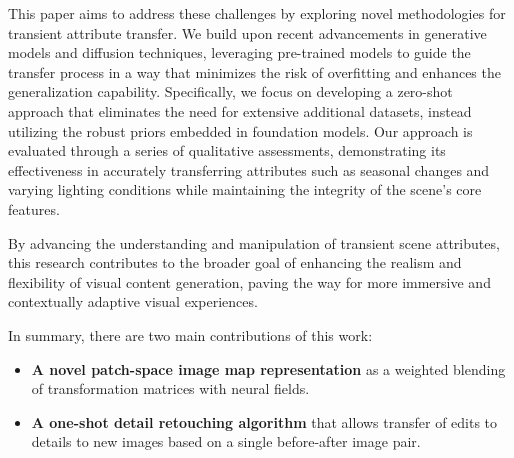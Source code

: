 This paper aims to address these challenges by exploring novel methodologies for transient attribute transfer. We build upon recent advancements in generative models and diffusion techniques, leveraging pre-trained models to guide the transfer process in a way that minimizes the risk of overfitting and enhances the generalization capability. Specifically, we focus on developing a zero-shot approach that eliminates the need for extensive additional datasets, instead utilizing the robust priors embedded in foundation models. Our approach is evaluated through a series of qualitative assessments, demonstrating its effectiveness in accurately transferring attributes such as seasonal changes and varying lighting conditions while maintaining the integrity of the scene's core features.

By advancing the understanding and manipulation of transient scene attributes, this research contributes to the broader goal of enhancing the realism and flexibility of visual content generation, paving the way for more immersive and contextually adaptive visual experiences.

In summary, there are two main contributions of this work: 

\begin{itemize}

    \item \textbf{A novel patch-space image map representation} as a weighted blending of transformation matrices with neural fields.
    
	\item \textbf{A one-shot detail retouching algorithm} that allows transfer of edits to details to new images based on a single before-after image pair.

\end{itemize}

